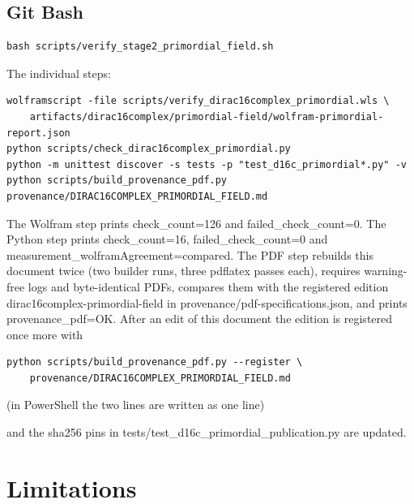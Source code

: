 \documentclass[11pt]{article}
\begin{document}
\subsection{Git Bash}

\begin{Verbatim}[fontsize=\small]
bash scripts/verify_stage2_primordial_field.sh
\end{Verbatim}

The individual steps:

\begin{Verbatim}[fontsize=\small]
wolframscript -file scripts/verify_dirac16complex_primordial.wls \
    artifacts/dirac16complex/primordial-field/wolfram-primordial-report.json
python scripts/check_dirac16complex_primordial.py
python -m unittest discover -s tests -p "test_d16c_primordial*.py" -v
python scripts/build_provenance_pdf.py provenance/DIRAC16COMPLEX_PRIMORDIAL_FIELD.md
\end{Verbatim}

The Wolfram step prints check\_count=126 and failed\_check\_count=0. The Python step prints check\_count=16, failed\_check\_count=0 and measurement\_wolframAgreement=compared. The PDF step rebuilds this document twice (two builder runs, three pdflatex passes each), requires warning-free logs and byte-identical PDFs, compares them with the registered edition dirac16complex-primordial-field in provenance/pdf-specifications.json, and prints provenance\_pdf=OK. After an edit of this document the edition is registered once more with

\begin{Verbatim}[fontsize=\small]
python scripts/build_provenance_pdf.py --register \
    provenance/DIRAC16COMPLEX_PRIMORDIAL_FIELD.md
\end{Verbatim}

(in PowerShell the two lines are written as one line)

and the sha256 pins in tests/test\_d16c\_primordial\_publication.py are updated.

\section{Limitations}
\end{document}
